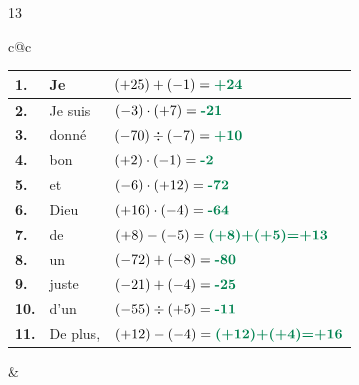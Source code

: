 \begin{solution}{13}

\renewcommand{\arraystretch}{1.7}
\setlength{\tabcolsep}{4pt}
\vspace{2mm}

\begin{center}
\begin{tabular}{c@{\hspace{8mm}}c}

  \begin{tabular}{|>{\centering\arraybackslash}p{6mm}|p{2.5cm}|p{4.0cm}|}
    \hline
    \cellcolor{gray!40}\textbf{1.}  &Je& $(+25)+(-1)=\rc{+24}$               \\ \hline
    \cellcolor{gray!40}\textbf{2.}  &Je suis& $(-3)\cdot(+7)=\rc{-21}$              \\ \hline
    \cellcolor{gray!40}\textbf{3.}  &donné& $(-70)\div(-7)=\rc{+10}$              \\ \hline
    \cellcolor{gray!40}\textbf{4.}  &bon& $(+2)\cdot(-1)=\rc{-2}$               \\ \hline
    \cellcolor{gray!40}\textbf{5.}  &et& $(-6)\cdot(+12)=\rc{-72}$             \\ \hline
    \cellcolor{gray!40}\textbf{6.}  &Dieu& $(+16)\cdot(-4)=\rc{-64}$             \\ \hline
    \cellcolor{gray!40}\textbf{7.}  &de& $(+8)-(-5)=\rc{(+8)+(+5)=+13}$        \\ \hline
    \cellcolor{gray!40}\textbf{8.}  &un& $(-72)+(-8)=\rc{-80}$                 \\ \hline
    \cellcolor{gray!40}\textbf{9.}  &juste& $(-21)+(-4)=\rc{-25}$                 \\ \hline
    \cellcolor{gray!40}\textbf{10.} &d'un& $(-55)\div(+5)=\rc{-11}$              \\ \hline
    \cellcolor{gray!40}\textbf{11.} &De plus,& $(+12)-(-4)=\rc{(+12)+(+4)=+16}$      \\ \hline
  \end{tabular}

  &


\end{tabular}
\end{center}
\end{solution}
